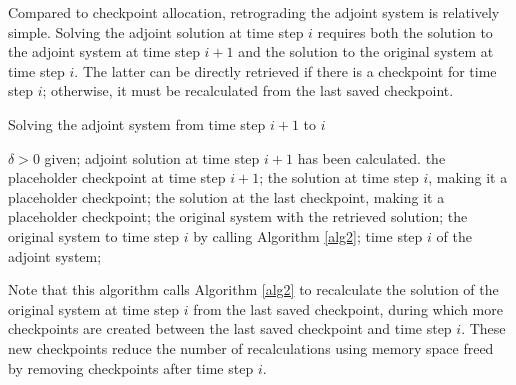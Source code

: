 Compared to checkpoint allocation, retrograding the adjoint system is
relatively simple.  Solving the adjoint solution at time step $i$ requires both
the solution to the adjoint system at time step $i + 1$ and the solution to the
original system at time step $i$.  The latter can be directly retrieved if
there is a checkpoint for time step $i$; otherwise, it must be recalculated
from the last saved checkpoint.
\begin{algorithm}
\caption{Solving the adjoint system from time step $i + 1$ to $i$}
\label{alg3}
\begin{algorithmic}[indent=3em]
    \REQUIRE $\delta > 0$ given; adjoint solution at time step $i + 1$ has
             been calculated.
     the placeholder checkpoint at time step $i + 1$;
         the solution at time step $i$, making it a 
               placeholder checkpoint;
    \ELSE
         the solution at the last checkpoint, making it
               a placeholder checkpoint;
         the original system with the retrieved solution;
         the original system to time step $i$ by calling
               Algorithm \ref{alg2};
    \ENDIF
     time step $i$ of the adjoint system;
\end{algorithmic}
\end{algorithm}
Note that this algorithm calls Algorithm \ref{alg2} to recalculate the
solution of the original system at time step $i$ from the last saved checkpoint,
during which more checkpoints are created between the last saved checkpoint
and time step $i$.  These new checkpoints reduce the number of recalculations
using memory space freed by removing checkpoints after time step $i$.

